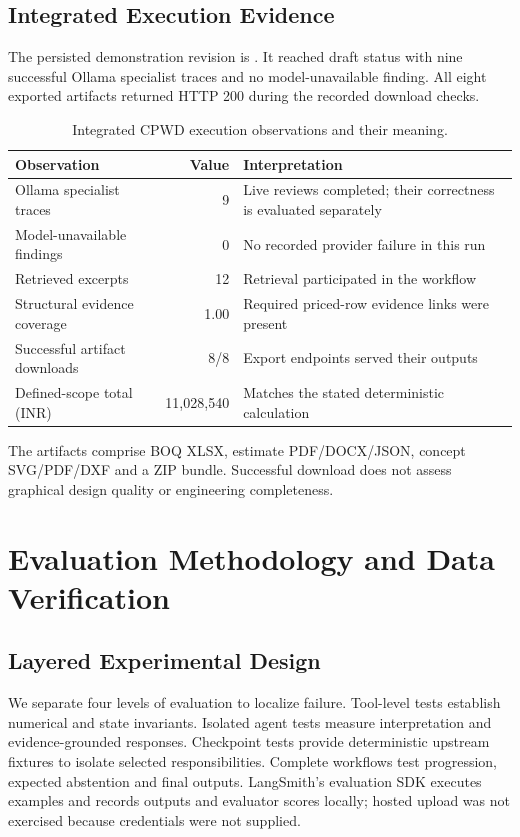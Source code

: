 \documentclass[11pt,a4paper]{article}
\newcommand{\pathcode}[1]{\texttt{\detokenize{#1}}}
\begin{document}
\subsection{Integrated Execution Evidence}
The persisted demonstration revision is \pathcode{8690eaa8-fe78-49f8-9770-620f440f110e}. It reached draft status with nine successful Ollama specialist traces and no model-unavailable finding. All eight exported artifacts returned HTTP 200 during the recorded download checks.
\begin{table}[H]\caption{Integrated CPWD execution observations and their meaning.}\small
\begin{tabularx}{\linewidth}{l r X}\toprule
Observation & Value & Interpretation \\\midrule
Ollama specialist traces & 9 & Live reviews completed; their correctness is evaluated separately \\
Model-unavailable findings & 0 & No recorded provider failure in this run \\
Retrieved excerpts & 12 & Retrieval participated in the workflow \\
Structural evidence coverage & 1.00 & Required priced-row evidence links were present \\
Successful artifact downloads & 8/8 & Export endpoints served their outputs \\
Defined-scope total (INR) & 11,028,540 & Matches the stated deterministic calculation \\\bottomrule
\end{tabularx}\end{table}
The artifacts comprise BOQ XLSX, estimate PDF/DOCX/JSON, concept SVG/PDF/DXF and a ZIP bundle. Successful download does not assess graphical design quality or engineering completeness.

\section{Evaluation Methodology and Data Verification}
\subsection{Layered Experimental Design}
We separate four levels of evaluation to localize failure. Tool-level tests establish numerical and state invariants. Isolated agent tests measure interpretation and evidence-grounded responses. Checkpoint tests provide deterministic upstream fixtures to isolate selected responsibilities. Complete workflows test progression, expected abstention and final outputs. LangSmith's evaluation SDK executes examples and records outputs and evaluator scores locally; hosted upload was not exercised because credentials were not supplied.
\end{document}
